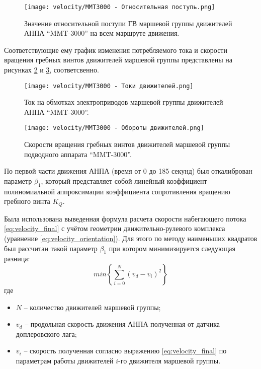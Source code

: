 \begin{figure}[ht]
    \centering
    \texttt{[image: velocity/MMT3000 - Относительная поступь.png]}
    \caption{Значение относительной поступи ГВ маршевой группы движителей АНПА ``MMT-3000'' на всем маршруте движения.}
    \label{fig:advance_ratio}
\end{figure}


Соответствующие ему график изменения потребляемого тока и скорости вращения гребных винтов движителей маршевой группы представлены на рисунках \ref{fig:mmt3000_curent} и  \ref{fig:mmt3000_rotation}, соответсвенно.

\begin{figure}[ht]
    \centering
    \texttt{[image: velocity/MMT3000 - Токи движителей.png]}
    \caption{Ток на обмотках электроприводов маршевой группы движителей АНПА ``MMT-3000''.}
    \label{fig:mmt3000_curent}
\end{figure}

\begin{figure}[ht]
    \centering
    \texttt{[image: velocity/MMT3000 - Обороты движителей.png]}
    \caption{Скорости вращения гребных винтов движителей маршевой группы подводного аппарата ``MMT-3000''.}
    \label{fig:mmt3000_rotation}
\end{figure}

По первой части движения АНПА (время от 0 до 185 секунд) был откалиброван параметр $\beta_1$, который представляет собой линейный коэффициент полиномиальной аппроксимации коэффициента сопротивления вращению гребного винта $K_Q$. 

Была использована выведенная формула расчета скорости набегающего потока \ref{eq:velocity_final} с учётом геометрии движительно-рулевого комплекса (уравнение \ref{eq:velocity_orientation}).
Для этого по методу наименьших квадратов был рассчитан такой параметр $\beta_1$ при котором минимизируется следующая разница:
\begin{equation}
    \label{eq:b1_search}
    min\left\{ \sum_{i=0}^N\left( v_d - v_i \right)^2 \right\}
\end{equation}
\noindent где
\begin{itemize}
    \item $N$ -- количество движителей маршевой группы;
    \item $v_d$ -- продольная скорость движения АНПА полученная от датчика доплеровского лага;
    \item $v_i$ -- скорость полученная согласно выражению \ref{eq:velocity_final} по параметрам работы движителей $i$-го движителя маршевой группы.
\end{itemize}

